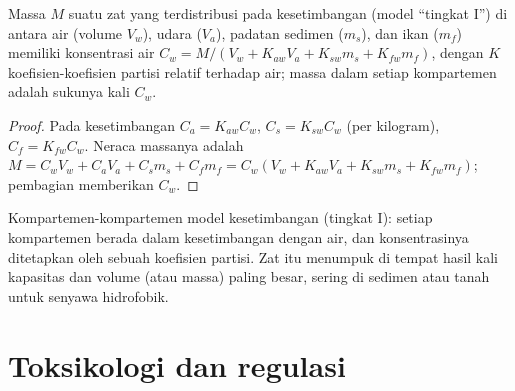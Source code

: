 \begin{proposition}\label{prop:b3:environmental-toxicology:level-one}
Massa $M$ suatu zat yang terdistribusi pada kesetimbangan (model ``tingkat I'') di antara air
(volume $V_w$), udara ($V_a$), padatan sedimen ($m_s$), dan ikan ($m_f$) memiliki konsentrasi air
$C_w = M/(V_w + K_{aw}V_a + K_{sw}m_s + K_{fw}m_f)$, dengan $K$ koefisien-koefisien partisi relatif terhadap
air; massa dalam setiap kompartemen adalah sukunya kali $C_w$.
\end{proposition}

\begin{proof}
Pada kesetimbangan $C_a = K_{aw}C_w$, $C_s = K_{sw}C_w$ (per kilogram), $C_f = K_{fw}C_w$. Neraca massanya adalah
$M = C_wV_w + C_aV_a + C_sm_s + C_fm_f = C_w(V_w + K_{aw}V_a + K_{sw}m_s + K_{fw}m_f)$; pembagian memberikan $C_w$.
\end{proof}

\begin{omfigure}

{\small Kompartemen-kompartemen model kesetimbangan (tingkat I): setiap kompartemen berada dalam
kesetimbangan dengan air, dan konsentrasinya ditetapkan oleh sebuah koefisien partisi.
Zat itu menumpuk di tempat hasil kali kapasitas dan volume (atau massa) paling
besar, sering di sedimen atau tanah untuk senyawa hidrofobik.}
\end{omfigure}

\section{Toksikologi dan regulasi}

